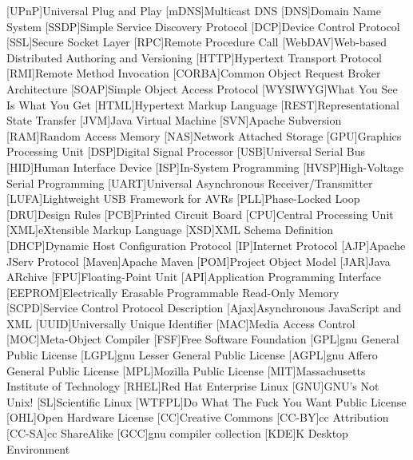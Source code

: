 \begin{acronym}[WYSIWYG]	%

[UPnP]{Universal Plug and Play}
[mDNS]{Multicast DNS}
[DNS]{Domain Name System}
[SSDP]{Simple Service Discovery Protocol}
[DCP]{Device Control Protocol}
[SSL]{Secure Socket Layer}
[RPC]{Remote Procedure Call}
[WebDAV]{Web-based Distributed Authoring and Versioning}
[HTTP]{Hypertext Transport Protocol}
[RMI]{Remote Method Invocation}
[CORBA]{Common Object Request Broker Architecture}
[SOAP]{Simple Object Access Protocol}
[WYSIWYG]{What You See Is What You Get}
[HTML]{Hypertext Markup Language}
[REST]{Representational State Transfer}
[JVM]{Java Virtual Machine}
[SVN]{Apache Subversion}
[RAM]{Random Access Memory}
[NAS]{Network Attached Storage}
[GPU]{Graphics Processing Unit}
[DSP]{Digital Signal Processor}
[USB]{Universal Serial Bus}
[HID]{Human Interface Device}
[ISP]{In-System Programming}
[HVSP]{High-Voltage Serial Programming}
[UART]{Universal Asynchronous Receiver/Transmitter}
[LUFA]{Lightweight USB Framework for AVRs}
[PLL]{Phase-Locked Loop}
[DRU]{Design Rules}
[PCB]{Printed Circuit Board}
[CPU]{Central Processing Unit}
[XML]{eXtensible Markup Language}
[XSD]{XML Schema Definition}
[DHCP]{Dynamic Host Configuration Protocol}
[IP]{Internet Protocol}
[AJP]{Apache JServ Protocol}
[Maven]{Apache Maven}
[POM]{Project Object Model}
[JAR]{Java ARchive}
[FPU]{Floating-Point Unit}
[API]{Application Programming Interface}
[EEPROM]{Electrically Erasable Programmable Read-Only Memory}
[SCPD]{Service Control Protocol Description}
[Ajax]{Asynchronous JavaScript and XML}
[UUID]{Universally Unique Identifier}
[MAC]{Media Access Control}
[MOC]{Meta-Object Compiler}
[FSF]{Free Software Foundation}
[GPL]{\acs{gnu} General Public License}
[LGPL]{\acs{gnu} Lesser General Public License}
[AGPL]{\acs{gnu} Affero General Public License}
[MPL]{Mozilla Public License}
[MIT]{Massachusetts Institute of Technology}
[RHEL]{Red Hat Enterprise Linux}
[GNU]{GNU's Not Unix!}
[SL]{Scientific Linux}
[WTFPL]{Do What The Fuck You Want Public License}
[OHL]{Open Hardware License}
[CC]{Creative Commons}
[CC-BY]{\acl{cc} Attribution}
[CC-SA]{\acl{cc} ShareAlike}
[GCC]{\acs{gnu} compiler collection}
[KDE]{K Desktop Environment}
\end{acronym}
